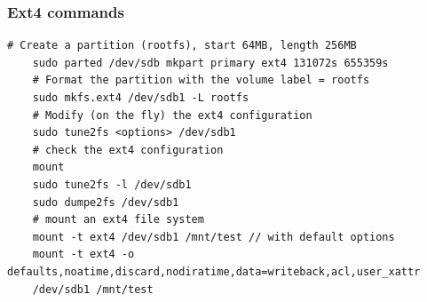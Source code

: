 \documentclass[resume]{subfiles}
\begin{document}
\subsubsection{Ext4 commands}
\begin{lstlisting}[style=console,label={},caption={}]
    # Create a partition (rootfs), start 64MB, length 256MB
    sudo parted /dev/sdb mkpart primary ext4 131072s 655359s
    # Format the partition with the volume label = rootfs
    sudo mkfs.ext4 /dev/sdb1 -L rootfs
    # Modify (on the fly) the ext4 configuration
    sudo tune2fs <options> /dev/sdb1
    # check the ext4 configuration
    mount
    sudo tune2fs -l /dev/sdb1
    sudo dumpe2fs /dev/sdb1
    # mount an ext4 file system
    mount -t ext4 /dev/sdb1 /mnt/test // with default options
    mount -t ext4 -o defaults,noatime,discard,nodiratime,data=writeback,acl,user_xattr
    /dev/sdb1 /mnt/test
\end{lstlisting}
\end{document}
